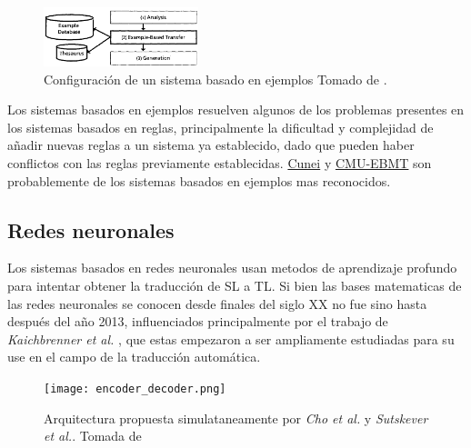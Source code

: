 \documentclass[12pt, letterpaper]{article}
\begin{document}
\begin{multicols}{2}
                \begin{figure}[H]
                    \centering
                    \includegraphics[width=0.4\textwidth]{example.png}
                    \caption[]{Configuración de un sistema basado en ejemplos Tomado de \cite{Sumita2005TranslatingWE}.}
                    \label{example}
                \end{figure}
                 
                Los sistemas basados en ejemplos resuelven algunos de los problemas presentes en los sistemas basados en reglas\cite{Sumita2005TranslatingWE}, principalmente
                la dificultad y complejidad de añadir nuevas reglas a un sistema ya establecido, dado que pueden haber conflictos con las reglas previamente establecidas. 
                \href{http://cunei.sourceforge.net/}{Cunei} y \href{http://www.cs.cmu.edu/~ralf/ebmt/ebmt.html}{CMU-EBMT} son probablemente de los sistemas basados en ejemplos
                mas reconocidos.
            \subsection{Redes neuronales}
                Los sistemas basados en redes neuronales usan metodos de aprendizaje profundo para intentar obtener la traducción de SL a TL. Si bien las bases matematicas de
                las redes neuronales se conocen desde finales del siglo XX no fue sino hasta después del año 2013, influenciados principalmente por el trabajo de \textit{Kaichbrenner et al.} \cite{Kalchbrenner},
                que estas empezaron a ser ampliamente estudiadas para su use en el campo de la traducción automática.
                
                \begin{figure}[H]
                    \centering
                    \texttt{[image: encoder\_decoder.png]}
                    \caption[]{Arquitectura propuesta simulataneamente por \textit{Cho et al.}\cite{Cho} y \textit{Sutskever et al.}\cite{Sutskever}. Tomada de \cite{Cho}}
                    \label{enconder_decoder}
                \end{figure}
                

\end{multicols}
\end{document}
